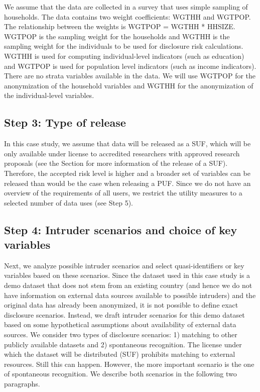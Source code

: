 \documentclass[letterpaper,10pt,english]{sphinxmanual}
\begin{document}
We assume that the data are collected in a survey that uses simple
sampling of households. The data contains two weight coefficients: WGTHH
and WGTPOP. The relationship between the weights is WGTPOP = WGTHH *
HHSIZE. WGTPOP is the sampling weight for the households and WGTHH is
the sampling weight for the individuals to be used for disclosure risk
calculations. WGTHH is used for computing individual-level indicators
(such as education) and WGTPOP is used for population level indicators
(such as income indicators). There are no strata variables available in
the data. We will use WGTPOP for the anonymization of the household
variables and WGTHH for the anonymization of the individual-level
variables.


\subsection{Step 3: Type of release}
\label{\detokenize{case_studies:step-3-type-of-release}}
In this case study, we assume that data will be released as a SUF, which
will be only available under license to accredited researchers with
approved research proposals (see the Section
for more information of the
release of a SUF). Therefore, the accepted risk level is higher and a
broader set of variables can be released than would be the case when
releasing a PUF. Since we do not have an overview of the requirements of
all users, we restrict the utility measures to a selected number of data
uses (see Step 5).


\subsection{Step 4: Intruder scenarios and choice of key variables}
\label{\detokenize{case_studies:step-4-intruder-scenarios-and-choice-of-key-variables}}
Next, we analyze possible intruder scenarios and select
quasi-identifiers or key variables based on these scenarios. Since the
dataset used in this case study is a demo dataset that does not stem
from an existing country (and hence we do not have information on
external data sources available to possible intruders) and the original
data has already been anonymized, it is not possible to define exact
disclosure scenarios. Instead, we draft intruder scenarios for this demo
dataset based on some hypothetical assumptions about availability of
external data sources. We consider two types of disclosure scenarios: 1)
matching to other publicly available datasets and 2) spontaneous
recognition. The license under which the dataset will be distributed
(SUF) prohibits matching to external resources. Still this can happen.
However, the more important scenario is the one of spontaneous
recognition. We describe both scenarios in the following two paragraphs.
\end{document}
